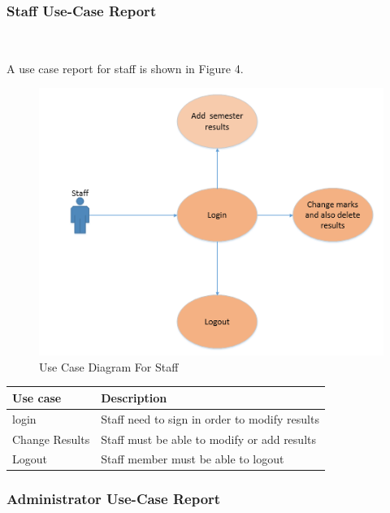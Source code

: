 \documentclass[10pt,onecolumn]{lab}
\begin{document}
\clearpage
\subsubsection{Staff Use-Case Report}$\;\;\;\;\;\;\;\;\;\;\;\;\;\;\;\;\;\;\;\;\;\;\;$

A use case report for staff is shown in Figure 4.
\begin{center}
\begin{figure}[h]
\centering
\includegraphics[trim={0cm 0cm 0cm 0cm },clip,scale = 1.1]{StaffUsecase}
\caption{Use Case Diagram For Staff}
\end{figure}
\end{center}



\begin{center}
    \begin{tabular}{ | p{2cm} | p{10cm}| }
    \hline
    \textbf{Use case}& \textbf{Description} \\ \hline
    login & Staff need to sign in order to modify results \\ \hline
    Change Results & Staff must be able to modify or add results  \\ \hline
    Logout          & Staff member must be able to logout  \\ \hline

    \end{tabular}
\end{center}




\clearpage
\subsubsection{Administrator Use-Case Report}$\;\;\;\;\;\;\;\;\;\;\;\;\;\;\;\;\;\;\;\;\;\;\;$
\end{document}
